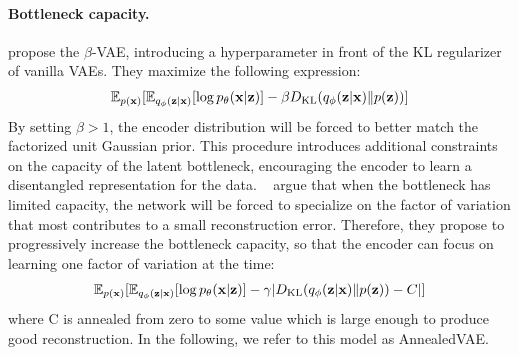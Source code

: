 \paragraph{Bottleneck capacity.}
 \citet{higgins2016beta} propose the $\beta$-VAE, introducing a hyperparameter in front of the KL regularizer of vanilla VAEs. They maximize the following expression:
\begin{align*}
\mathbb{E}_{p({\mathbf{x}})} [\mathbb{E}_{q_\phi({\mathbf{z}}|{\mathbf{x}})}[\log p_\theta({\mathbf{x}}|{\mathbf{z}})] - \beta D_{\mathrm{KL}}(q_\phi({\mathbf{z}}|{\mathbf{x}}) \| p({\mathbf{z}}))]
\end{align*} 
By setting $\beta > 1$, the encoder distribution will be forced to better match the factorized unit Gaussian prior. This procedure introduces additional constraints on the capacity of the latent bottleneck, encouraging the encoder to learn a disentangled representation for the data. 
~\citet{burgess2018understanding} argue that when the bottleneck has limited capacity, the network will be forced to specialize on the factor of variation that most contributes to a small reconstruction error. Therefore, they propose to progressively increase the bottleneck capacity, so that the encoder can focus on learning one factor of variation at the time:
\begin{align*}
\mathbb{E}_{p({\mathbf{x}})} [\mathbb{E}_{q_\phi({\mathbf{z}}|{\mathbf{x}})}[\log p_\theta({\mathbf{x}}|{\mathbf{z}})] - \gamma | D_{\mathrm{KL}}(q_\phi({\mathbf{z}}|{\mathbf{x}}) \| p({\mathbf{z}})) - C |]
\end{align*}
where C is annealed from zero to some value which is large enough to produce good reconstruction. 
In the following, we refer to this model as AnnealedVAE.

